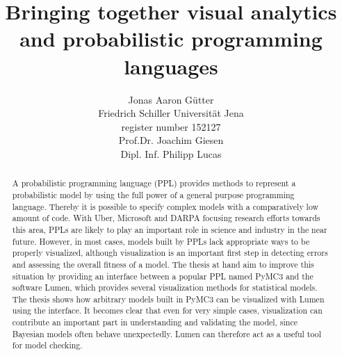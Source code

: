 \documentclass{article}
\title{Bringing together visual analytics and probabilistic programming languages}
\author{Jonas Aaron Gütter  \\
	Friedrich Schiller Universität Jena  \\
    register number 152127 \\
    Prof.Dr. Joachim Giesen \\
    Dipl. Inf. Philipp Lucas
	}
\begin{document}
\maketitle

\begin{abstract}
A probabilistic programming language (PPL) provides methods to represent a probabilistic model by using the full power of a general purpose programming language. Thereby it is possible to specify complex models with a comparatively low amount of code. With Uber, Microsoft and DARPA focusing research efforts towards this area, PPLs are likely to play an important role in science and industry in the near future. However, in most cases, models built by PPLs lack appropriate ways to be properly visualized, although visualization is an important first step in detecting errors and assessing the overall fitness of a model. The thesis at hand aim to improve this situation by providing an interface between a popular PPL named PyMC3 and the software Lumen, which provides several visualization methods for statistical models. The thesis shows how arbitrary models built in PyMC3 can be visualized with Lumen using the interface. It becomes clear that even for very simple cases, visualization can contribute an important part in understanding and validating the model, since Bayesian models often behave unexpectedly. Lumen can therefore act as a useful tool for model checking.
\end{abstract}

\tableofcontents
\end{document}
